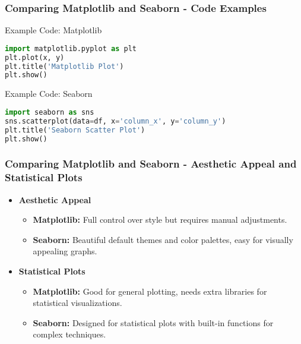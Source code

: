 \documentclass[aspectratio=169]{beamer}
\begin{document}
\begin{frame}[fragile]
  \frametitle{Comparing Matplotlib and Seaborn - Code Examples}
  \begin{block}{Example Code: Matplotlib}
    \begin{lstlisting}[language=Python]
import matplotlib.pyplot as plt
plt.plot(x, y)
plt.title('Matplotlib Plot')
plt.show()
    \end{lstlisting}
  \end{block}
  
  \begin{block}{Example Code: Seaborn}
    \begin{lstlisting}[language=Python]
import seaborn as sns
sns.scatterplot(data=df, x='column_x', y='column_y')
plt.title('Seaborn Scatter Plot')
plt.show()
    \end{lstlisting}
  \end{block}
\end{frame}

\begin{frame}[t]
  \frametitle{Comparing Matplotlib and Seaborn - Aesthetic Appeal and Statistical Plots}
  \begin{itemize}
    \item \textbf{Aesthetic Appeal}
      \begin{itemize}
        \item \textbf{Matplotlib:} Full control over style but requires manual adjustments.
        \item \textbf{Seaborn:} Beautiful default themes and color palettes, easy for visually appealing graphs.
      \end{itemize}
    \item \textbf{Statistical Plots}
      \begin{itemize}
        \item \textbf{Matplotlib:} Good for general plotting, needs extra libraries for statistical visualizations.
        \item \textbf{Seaborn:} Designed for statistical plots with built-in functions for complex techniques.
      \end{itemize}
  \end{itemize}
\end{frame}
\end{document}
